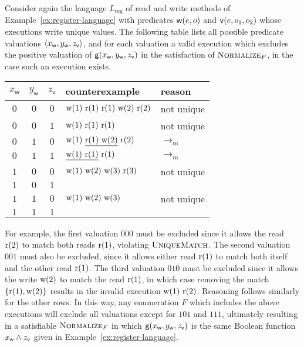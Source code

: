 \begin{example}

  Consider again the language $L_\mathrm{reg}$ of read and write methods of
  Example~\ref{ex:register-language} with predicates ${\sf w}(e,o)$ and ${\sf
  v}(e,o_1,o_2)$ whose executions write unique values. The following table
  lists all possible predicate valuations ${\left\langle{x_{\sf w}, y_{\sf w}, z_{\sf
  v}}\right\rangle}$, and for each valuation a valid execution which excludes the positive
  valuation of ${\sf g}(x_{\sf w}, y_{\sf w}, z_{\sf v})$ in the satisfaction
  of $\textsc{Normalize}_F$, in the case such an execution exists.
  \begin{center}
    \begin{tabular}{ccc|ll}
      $x_\mathsf{w}$ & $y_\mathsf{w}$ & $z_\mathsf{v}$ & counterexample & reason \\
      \hline
      $0$ & $0$ & $0$ & ${\rm w}(1) \ {\rm r}(1) \ {\rm r}(1) \ {\rm w}(2) \ {\rm r}(2)$ & not unique \\
      $0$ & $0$ & $1$ & ${\rm w}(1) \ {\rm r}(1) \ {\rm r}(1)$ & not unique \\
      $0$ & $1$ & $0$ & ${\rm w}(1) \ \underline{{\rm r}(1) \ {\rm w}(2)} \ {\rm r}(2)$ & $\to_\mathrm{m}$ \\
      $0$ & $1$ & $1$ & $\underline{{\rm w}(1) \ {\rm r}(1)} \ {\rm r}(1)$ & $\to_\mathrm{m}$ \\
      $1$ & $0$ & $0$ & ${\rm w}(1) \ {\rm w}(2) \ {\rm w}(3) \ {\rm r}(3)$ & not unique \\
      $1$ & $0$ & $1$ & & \\
      $1$ & $1$ & $0$ & ${\rm w}(1) \ {\rm w}(2) \ {\rm w}(3)$ & not unique \\
      $1$ & $1$ & $1$ & & \\
    \end{tabular}
  \end{center}
  For example, the first valuation $000$ must be excluded since it allows the
  read ${\rm r}(2)$ to match both reads ${\rm r}(1)$, violating
  $\textsc{UniqueMatch}$. The second valuation $001$ must also be excluded,
  since it allows either read ${\rm r}(1)$ to match both itself and the other
  read ${\rm r}(1)$. The third valuation $010$ must be excluded since it allows
  the write ${\rm w}(2)$ to match the read ${\rm r}(1)$, in which case removing
  the match ${\{{ {\rm r}(1), {\rm w}(2) }\}}$ results in the invalid execution
  ${\rm w}(1)\ {\rm r}(2)$. Reasoning follows similarly for the other rows.
  In this way, any enumeration $F$ which includes the above executions
  will exclude all valuations except for $101$ and $111$, ultimately resulting
  in a satisfiable $\textsc{Normalize}_F$ in which ${\sf g}(x_{\sf w}, y_{\sf
  w}, z_{\sf v})$ is the same Boolean function $x_{\sf w} \land z_{\sf v}$
  given in Example~\ref{ex:register-language}.

\end{example}

